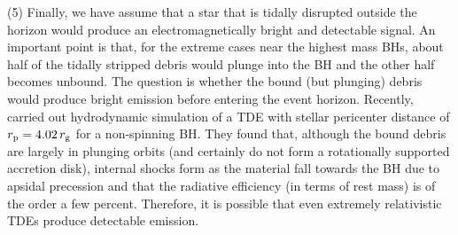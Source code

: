 \documentclass[useAMS,usenatbib]{mn2e}
\def\rg{r_{\rm g}}
\def\rp{r_{\rm p}}
\def\note{\textcolor{magenta}}
\begin{document}


(5) Finally, we have assume that a star that is tidally disrupted outside the horizon would produce an electromagnetically bright and detectable signal. An important point is that, for the extreme cases near the highest mass BHs, about half of the tidally stripped debris would plunge into the BH and the other half becomes unbound. The question is whether the bound (but plunging) debris would produce bright emission before entering the event horizon. Recently, \citet{Ryu22_extremely_relativistic_TDEs} carried out hydrodynamic simulation of a TDE with stellar pericenter distance of $\rp=4.02\,\rg$ for a non-spinning BH. They found that, although the bound debris are largely in plunging orbits (and certainly do not form a rotationally supported accretion disk), internal shocks form as the material fall towards the BH due to apsidal precession and that the radiative efficiency (in terms of rest mass) is of the order a few percent. Therefore, it is possible that even extremely relativistic TDEs produce detectable emission.
\end{document}
